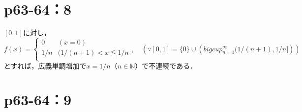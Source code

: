 \documentclass[a4paper,10pt,fleqn]{ltjsarticle}
\begin{document}
    \section*{p63-64：8}
    \begin{leftbar}
      $ [0,1]$に対し，
      \[
      f(x)= \begin{cases} 
        0 & (x=0) \\
        1/n & (1/(n+1) < x \leqq 1/n\\
      \end{cases}
      ,\quad \left ( \because [0,1] = \{ 0 \} \cup \left ( bigcup_{n=1}^{\infty} (1/(n+1),1/n] \right ) \right )
      \]
      とすれば，広義単調増加で$x=1/n$（$n \in \mathbb{N}$）で不連続である．
    \end{leftbar}
    \newpage 

    \section*{p63-64：9}
\end{document}
